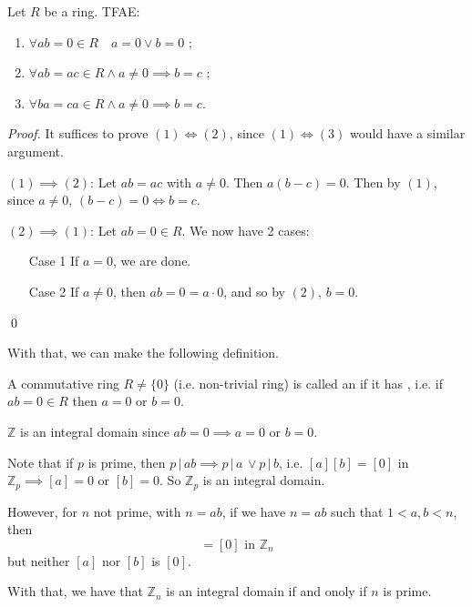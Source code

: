 \begin{propo}
\label{propo:ring_cancellations_and_zeros}
  Let $R$ be a ring. TFAE:
  \begin{enumerate}
    \item $\forall ab = 0 \in R \quad a = 0 \lor b = 0$ ;
    \item $\forall ab = ac \in R \land a \neq 0 \implies b = c$ ;
    \item $\forall ba = ca \in R \land a \neq 0 \implies b = c$.
  \end{enumerate}
\end{propo}

\begin{proof}
  It suffices to prove $(1) \iff (2)$, since $(1) \iff (3)$ would have a similar argument.

    \noindent $(1) \implies (2)$: Let $ab = ac$ with $a \neq 0$. Then $a(b - c) = 0$. Then by $(1)$, since $a \neq 0$, $(b - c) = 0 \iff b = c$.

    \noindent $(2) \implies (1)$: Let $ab = 0 \in R$. We now have 2 cases:
    \begin{enumerate}
      \item[Case 1] If $a = 0$, we are done.
      \item[Case 2] If $a \neq 0$, then $ab = 0 = a \cdot 0$, and so by $(2)$, $b = 0$.
    \end{enumerate}\qed
\end{proof}

With that, we can make the following definition.

\begin{defn}
\label{defn:integral_domain}
A commutative ring $R \neq \{0\}$ (i.e. non-trivial ring) is called an  if it has , i.e. if $ab = 0 \in R$ then $a = 0$ or $b = 0$.
\end{defn}

\begin{eg}\label{eg:integral_domain_that_is_not_a_field}
  $\mathbb{Z}$ is an integral domain since $ab = 0 \implies a = 0$ or $b = 0$.
\end{eg}

\begin{eg}
  Note that if $p$ is prime, then $p \, | \, ab \implies p \, | \, a \, \lor p \, | \, b$, i.e. $[a][b] = [0]$ in $\mathbb{Z}_p \implies [a] = 0$ or $[b] = 0$. So $\mathbb{Z}_p$ is an integral domain.

  However, for $n$ not prime, with $n = ab$, if we have $n = ab$ such that $1 < a, b < n$, then
  \begin{equation*}
    [a][b] = [0] \text{ in } \mathbb{Z}_n
  \end{equation*}
  but neither $[a]$ nor $[b]$ is $[0]$.

  With that, we have that $\mathbb{Z}_n$ is an integral domain if and onoly if $n$ is prime.
\end{eg}

